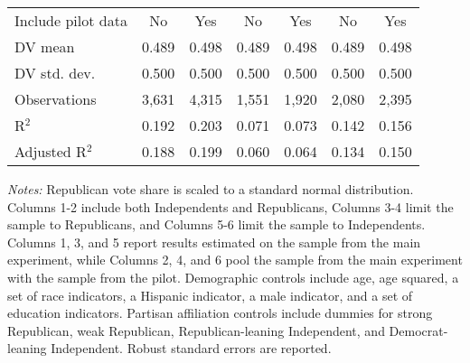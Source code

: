 \begin{table}[!htbp]
\begin{threeparttable}
\begin{tabular}{@{\hspace{5pt}}l@{\hspace{5pt}}cccccc}
\midrule
Include pilot data & No & Yes & No & Yes & No & Yes \\
\addlinespace
DV mean & 0.489 & 0.498 & 0.489 & 0.498 & 0.489 & 0.498 \\
DV std. dev. & 0.500 & 0.500 & 0.500 & 0.500 & 0.500 & 0.500 \\
Observations & 3,631 & 4,315 & 1,551 & 1,920 & 2,080 & 2,395 \\ 
R$^{2}$ & 0.192 & 0.203 & 0.071 & 0.073 & 0.142 & 0.156 \\ 
Adjusted R$^{2}$ & 0.188 & 0.199 & 0.060 & 0.064 & 0.134 & 0.150 \\ 
\bottomrule 
\end{tabular} 
\begin{tablenotes}
\footnotesize
\item \textit{Notes:} Republican vote share is scaled to a standard normal distribution. Columns 1-2 include both Independents and Republicans, Columns 3-4 limit the sample to Republicans, and Columns 5-6 limit the sample to Independents. Columns 1, 3, and 5 report results estimated on the sample from the main experiment, while Columns 2, 4, and 6 pool the sample from the main experiment with the sample from the pilot. Demographic controls include age, age squared, a set of race indicators, a Hispanic indicator, a male indicator, and a set of education indicators. Partisan affiliation controls include dummies for strong Republican, weak Republican, Republican-leaning Independent, and Democrat-leaning Independent. Robust standard errors are reported.
\end{tablenotes}
\end{threeparttable}
\end{table} 
